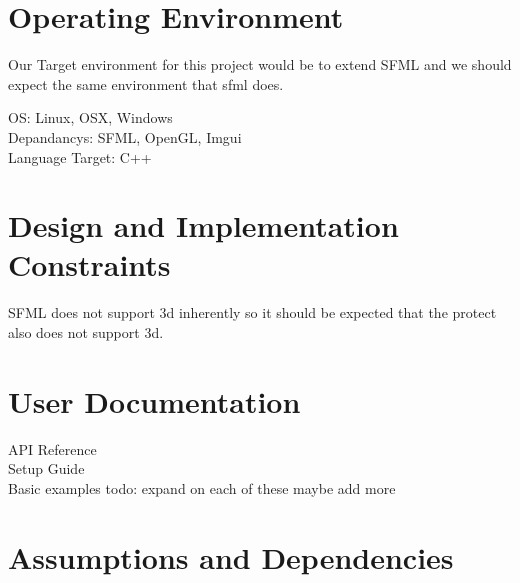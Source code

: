 \documentclass{scrreprt}
\begin{document}
\section{Operating Environment}

Our Target environment for this project would be to extend SFML and we should expect the same environment that sfml does.

OS: Linux, OSX, Windows\\
Depandancys: SFML, OpenGL, Imgui\\
Language Target: C++\\



\section{Design and Implementation Constraints}
SFML does not support 3d inherently so it should be expected that the protect also does not  support 3d.


\section{User Documentation}
API Reference
\\
Setup Guide
\\
Basic examples
todo: expand on each of these maybe add more

\section{Assumptions and Dependencies}
\end{document}
